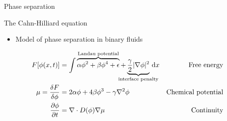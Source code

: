 \documentclass[presentation]{beamer}
\begin{document}
\begin{frame}[label=sec-4-3]{Phase separation}
\begin{block}{The Cahn-Hilliard equation}
\begin{itemize}
\item Model of phase separation in binary fluids
\end{itemize}
\begin{equation*}
\begin{aligned}
F[\phi(x, t)] &= \int \overbrace{\alpha \phi^2 + \beta \phi^4 + \epsilon}^{\mathclap{\text{Landau potential}}} + \underbrace{\frac{\gamma}{2} |\nabla\phi|^2}_{\mathclap{\text{interface penalty}}}\,\mathrm{d}x & \text{Free energy}\\
\mu = \frac{\delta F}{\delta \phi} &= 2\alpha\phi + 4\beta\phi^3 - \gamma\nabla^2\phi & \text{Chemical potential}\\
\frac{\partial \phi}{\partial t} &= \nabla \cdot D(\phi) \nabla \mu & \text{Continuity}
\end{aligned}
\end{equation*}
\end{block}
\end{frame}
\end{document}
